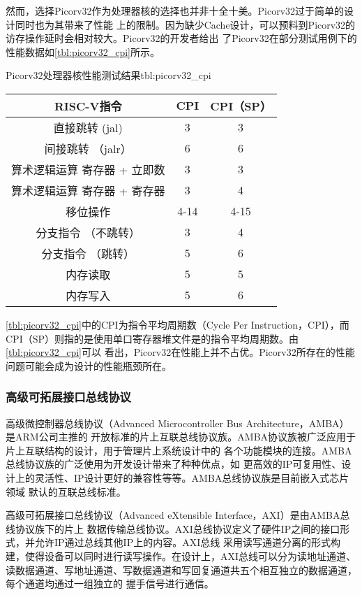 然而，选择Picorv32作为处理器核的选择也并非十全十美。Picorv32过于简单的设计同时也为其带来了性能
上的限制。因为缺少Cache设计，可以预料到Picorv32的访存操作延时会相对较大。Picorv32的开发者给出
了Picorv32在部分测试用例下的性能数据如\autoref{tbl:picorv32_cpi}所示。

\begin{generaltab}{Picorv32处理器核性能测试结果\cite{picorv32}}{tbl:picorv32_cpi}
  \begin{tabular}{ccc}
    \toprule
    RISC-V指令 & CPI & CPI（SP） \\
    \midrule
    直接跳转 (jal) & 3 & 3 \\
    间接跳转 （jalr） & 6 & 6 \\
    算术逻辑运算 寄存器 + 立即数 & 3 & 3 \\
    算术逻辑运算 寄存器 + 寄存器 & 3 & 4 \\
    移位操作 & 4-14 & 4-15 \\
    分支指令 （不跳转） & 3 & 4 \\
    分支指令 （跳转） & 5 & 6 \\
    内存读取 & 5 & 5 \\
    内存写入 & 5 & 6 \\
    \bottomrule
  \end{tabular}
\end{generaltab}

\autoref{tbl:picorv32_cpi}中的CPI为指令平均周期数（Cycle Per Instruction，CPI），而
CPI（SP）则指的是使用单口寄存器堆文件是的指令平均周期数。由\autoref{tbl:picorv32_cpi}可以
看出，Picorv32在性能上并不占优。Picorv32所存在的性能问题可能会成为设计的性能瓶颈所在。

\subsubsection{高级可拓展接口总线协议}

高级微控制器总线协议（Advanced Microcontroller Bus Architecture，AMBA）是ARM公司主推的
开放标准的片上互联总线协议族。AMBA协议族被广泛应用于片上互联结构的设计，用于管理片上系统设计中的
各个功能模块的连接\cite{intro_amba_axi}。AMBA总线协议族的广泛使用为开发设计带来了种种优点，如
更高效的IP可复用性、设计上的灵活性、IP设计更好的兼容性等等。AMBA总线协议族是目前嵌入式芯片领域
默认的互联总线标准。

高级可拓展接口总线协议（Advanced eXtensible Interface，AXI）是由AMBA总线协议族下的片上
数据传输总线协议。AXI总线协议定义了硬件IP之间的接口形式，并允许IP通过总线其他IP上的内容。AXI总线
采用读写通道分离的形式构建，使得设备可以同时进行读写操作。在设计上，AXI总线可以分为读地址通道、
读数据通道、写地址通道、写数据通道和写回复通道共五个相互独立的数据通道，每个通道均通过一组独立的
握手信号进行通信。


